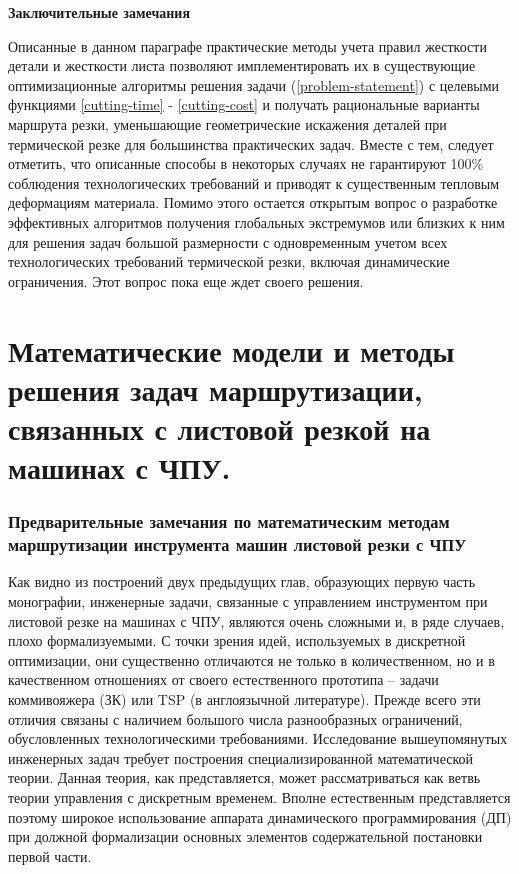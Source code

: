 \documentclass[11pt,twoside,openany]{report}
\newcounter{lem}
\begin{document}
{\bf Заключительные замечания}

Описанные в данном параграфе практические методы учета
правил жесткости детали и жесткости листа позволяют
имплементировать их в существующие оптимизационные
алгоритмы решения задачи (\ref{problem-statement})
с целевыми функциями \ref{cutting-time} - \ref{cutting-cost}
и получать рациональные варианты маршрута резки,
уменьшающие геометрические искажения деталей
при термической резке для большинства практических задач.
Вместе с тем, следует отметить,
что описанные способы в некоторых случаях не гарантируют 100\%
соблюдения технологических требований и
приводят к существенным тепловым деформациям материала.
Помимо этого остается открытым вопрос о разработке
эффективных алгоритмов получения глобальных экстремумов или
близких к ним для решения задач большой размерности с
одновременным учетом всех технологических требований
термической резки, включая динамические ограничения.
Этот вопрос  пока еще ждет своего решения.













\part{Математические модели и методы решения задач маршрутизации, связанных с листовой резкой на машинах с ЧПУ.}

\section*{Предварительные замечания по математическим методам маршрутизации инструмента машин листовой резки с ЧПУ}

Как видно из построений двух предыдущих глав, образующих первую часть монографии, инженерные задачи, связанные с управлением инструментом при листовой резке на машинах с ЧПУ, являются очень сложными и, в ряде случаев, плохо формализуемыми. С точки зрения идей, используемых в дискретной оптимизации, они существенно отличаются не только в количественном, но и в качественном отношениях от своего естественного прототипа – задачи коммивояжера (ЗК) или TSP (в англоязычной литературе). Прежде всего эти отличия связаны с наличием большого числа разнообразных ограничений, обусловленных технологическими требованиями. Исследование вышеупомянутых инженерных задач требует построения специализированной математической теории. Данная теория, как представляется, может рассматриваться как ветвь теории управления с дискретным временем. Вполне естественным представляется поэтому широкое использование аппарата динамического программирования (ДП) при должной формализации основных элементов содержательной постановки первой части.
\end{document}
